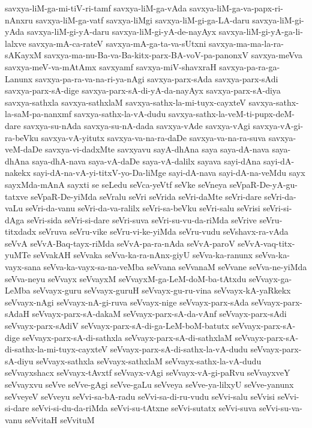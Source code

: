 {savxya-liM-ga-mi-tiV-ri-tamf
savxya-liM-ga-vAda
savxya-liM-ga-va-papx-ri-nAnxru
savxya-liM-ga-vatf
savxya-liMgi
savxya-liM-gi-ga-LA-daru
savxya-liM-gi-yAda
savxya-liM-gi-yA-daru
savxya-liM-gi-yA-de-nayAyx
savxya-liM-gi-yA-ga-li-lalxve
savxya-mA-ca-rateV
savxya-mA-ga-ta-va-sUtxni
savxya-ma-ma-la-ra-sAKayxM
savxya-ma-nu-Ba-va-Ba-kitx-parx-BA-voV-pa-panonxV
savxya-meVva
savxya-meV-va-mAtAmx
savxyamf
savxya-miV-shavxraH
savxya-pa-ra-ga-Lanunx
savxya-pa-ra-va-na-ri-ya-nAgi
savxya-parx-sAda
savxya-parx-sAdi
savxya-parx-sA-dige
savxya-parx-sA-di-yA-da-nayAyx
savxya-parx-sA-diya
savxya-sathxla
savxya-sathxlaM
savxya-sathx-la-mi-tuyx-cayxteV
savxya-sathx-la-saM-pa-nanxmf
savxya-sathx-la-vA-dudu
savxya-sathx-la-veM-ti-pupx-deM-dare
savxya-su-nAda
savxya-su-nA-dada
savxya-vAde
savxya-vAgi
savxya-vA-gi-ra-beVku
savxya-vA-yitutx
savxya-va-na-ra-daDe
savxya-va-na-ra-suva
savxya-veM-daDe
savxya-vi-dadxMte
savxyavu
sayA-dhAna
saya
saya-dA-nava
saya-dhAna
saya-dhA-nava
saya-vA-daDe
saya-vA-dalilx
sayava
sayi-dAna
sayi-dA-nakekx
sayi-dA-na-vA-yi-titxV-yo-Da-liMge
sayi-dA-nava
sayi-dA-na-veMdu
sayx
sayxMda-mAnA
sayxti
se
seLedu
seVca-yeVtf
seVke
seVneya
seVpaR-De-yA-gu-tatxve
seVpaR-De-yiMda
seVralu
seVri
seVrida
seVri-daMte
seVri-dare
seVri-da-vaLu
seVri-da-vanu
seVri-da-va-ralilx
seVri-sa-beVku
seVri-salu
seVrisi
seVri-si-dAga
seVri-sida
seVri-si-dare
seVri-suva
seVri-su-vu-da-riMda
seVrive
seVru-titxdadx
seVruva
seVru-vike
seVru-vi-ke-yiMda
seVru-vudu
seVshavx-ra-vAda
seVvA
seVvA-Baq-tayx-riMda
seVvA-pa-ra-nAda
seVvA-paroV
seVvA-vaq-titx-yuMTe
seVvakAH
seVvaka
seVva-ka-ra-nAnx-giyU
seVva-ka-ranunx
seVva-ka-vayx-sana
seVva-ka-vayx-sa-na-veMba
seVvana
seVvanaM
seVvane
seVva-ne-yiMda
seVva-neyu
seVvayx
seVvayxM
seVvayxM-ga-LeM-doM-ba-tAtxdu
seVvayx-ga-LeMba
seVvayx-guru
seVvayx-guruH
seVvayx-gu-ru-vina
seVvayx-kA-yaRkekx
seVvayx-nAgi
seVvayx-nA-gi-ruva
seVvayx-nige
seVvayx-parx-sAda
seVvayx-parx-sAdaH
seVvayx-parx-sA-dakaM
seVvayx-parx-sA-da-vAnf
seVvayx-parx-sAdi
seVvayx-parx-sAdiV
seVvayx-parx-sA-di-ga-LeM-boM-batutx
seVvayx-parx-sA-dige
seVvayx-parx-sA-di-sathxla
seVvayx-parx-sA-di-sathxlaM
seVvayx-parx-sA-di-sathx-la-mi-tuyx-cayxteV
seVvayx-parx-sA-di-sathx-la-vA-dudu
seVvayx-parx-sA-diyu
seVvayx-sathxla
seVvayx-sathxlaM
seVvayx-sathx-la-vA-dudu
seVvayxshacx
seVvayx-tAvxtf
seVvayx-vAgi
seVvayx-vA-gi-paRvu
seVvayxveY
seVvayxvu
seVve
seVve-gAgi
seVve-gaLu
seVveya
seVve-ya-lilxyU
seVve-yanunx
seVveyeV
seVveyu
seVvi-sa-bA-radu
seVvi-sa-di-ru-vudu
seVvi-salu
seVvisi
seVvi-si-dare
seVvi-si-du-da-riMda
seVvi-su-tAtxne
seVvi-sutatx
seVvi-suva
seVvi-su-va-vanu
seVvitaH
seVvituM
}
